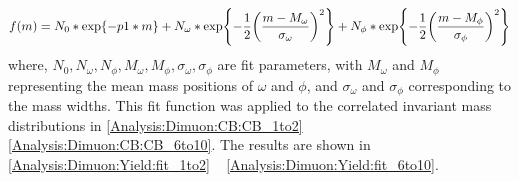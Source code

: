                 \begin{eqnarray}
                    f(m)=N_0*\exp{-p1* m}+N_{\omega}*\exp{-\frac{1}{2}\qty(\frac{m-M_{\omega}}{\sigma_{\omega}})^2}+N_{\phi}*\exp{-\frac{1}{2}\qty(\frac{m-M_{\phi}}{\sigma_{\phi}})^2}
                \end{eqnarray}
                where, $N_0, N_{\omega}, N_{\phi}, M_{\omega}, M_{\phi}, \sigma_{\omega}, \sigma_{\phi}$ are fit parameters, with $M_{\omega}$ and $M_{\phi}$ representing the mean mass positions of $\omega$ and $\phi$, and $\sigma_{\omega}$ and $\sigma_{\phi}$ corresponding to the mass widths. This fit function was applied to the correlated invariant mass distributions in \ref{Analysis:Dimuon:CB:CB_1to2} ~ \ref{Analysis:Dimuon:CB:CB_6to10}. The results are shown in \ref{Analysis:Dimuon:Yield:fit_1to2} ~ \ref{Analysis:Dimuon:Yield:fit_6to10}.
